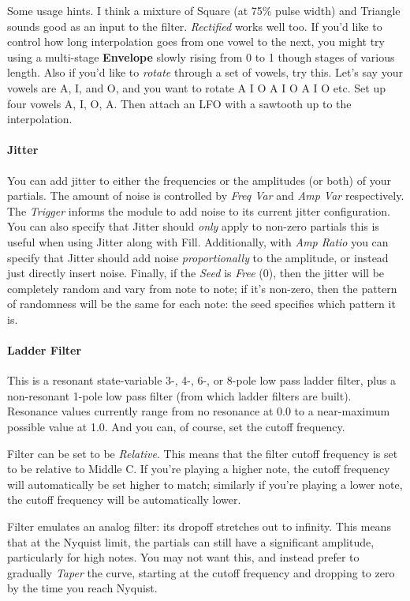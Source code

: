 \documentclass{article}
\begin{document}
Some usage hints.  I think a mixture of Square (at 75\% pulse width) and Triangle sounds good as an input to the filter.  {\it Rectified} works well too.  If you'd like to control how long interpolation goes from one vowel to the next, you might try using a multi-stage {\bf Envelope} slowly rising from 0 to 1 though stages of various length.  Also if you'd like to {\it rotate} through a set of vowels, try this.  Let's say your vowels are A, I, and O, and you want to rotate A I O A I O A I O etc.  Set up four vowels A, I, O, A.  Then attach an LFO with a sawtooth up to the interpolation.

\paragraph{Jitter} You can add jitter to either the frequencies or the amplitudes (or both) of your partials.  The amount of noise is controlled by {\it Freq Var} and {\it Amp Var} respectively.  The {\it Trigger} informs the module to add noise to its current jitter configuration.  You can also specify that Jitter should {\it only} apply to non-zero partials this is useful when using Jitter along with Fill.   Additionally, with {\it Amp Ratio} you can specify that Jitter should add noise {\it proportionally} to the amplitude, or instead just directly insert noise.  Finally, if the {\it Seed} is {\it Free} (0), then the jitter will be completely random and vary from note to note; if it's non-zero, then the pattern of randomness will be the same for each note: the seed specifies which pattern it is.

\paragraph{Ladder Filter}  This is a resonant state-variable 3-, 4-, 6-, or 8-pole low pass ladder filter, plus a non-resonant 1-pole low pass filter (from which ladder filters are built).  Resonance values currently range from no resonance at 0.0 to a near-maximum possible value at 1.0.  And you can, of course, set the cutoff frequency.

Filter can be set to be {\it Relative}.  This means that the filter cutoff frequency is set to be relative to Middle C.  If you're playing a higher note, the cutoff frequency will automatically be set higher to match; similarly if you're playing a lower note, the cutoff frequency will be automatically lower.

Filter emulates an analog filter: its dropoff stretches out to infinity. This means that at the Nyquist limit, the partials can still have a significant amplitude, particularly for high notes.  You may not want this, and instead prefer to gradually {\it Taper} the curve, starting at the cutoff frequency and dropping to zero by the time you reach Nyquist.  
\end{document}
